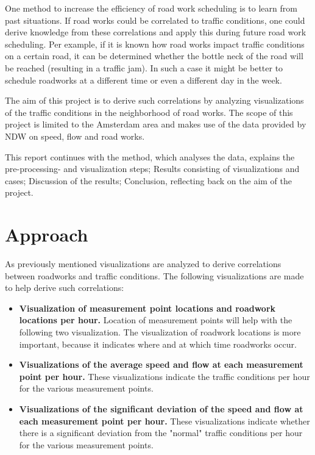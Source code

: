 \documentclass[sigconf]{acmart}
\begin{document}
One method to increase the efficiency of road work scheduling is to learn from past situations. If road works could be correlated to traffic conditions, one could derive knowledge from these correlations and apply this during future road work scheduling. Per example, if it is known how road works impact traffic conditions on a certain road, it can be determined whether the bottle neck of the road will be reached (resulting in a traffic jam). In such a case it might be better to schedule roadworks at a different time or even a different day in the week.

The aim of this project is to derive such correlations by analyzing visualizations of the traffic conditions in the neighborhood of road works. The scope of this project is limited to the Amsterdam area and makes use of the data provided by NDW on speed, flow and road works.

This report continues with the method, which analyses the data, explains the pre-processing- and visualization steps; Results consisting of visualizations and cases; Discussion of the results; Conclusion, reflecting back on the aim of the project.

\section{Approach}

As previously mentioned visualizations are analyzed to derive correlations between roadworks and traffic conditions. The following visualizations are made to help derive such correlations:
\begin{itemize}
    \item \textbf{Visualization of measurement point locations and roadwork locations per hour.} Location of measurement points will help with the following two visualization. The visualization of roadwork locations is more important, because it indicates where and at which time roadworks occur.
    \item \textbf{Visualizations of the average speed and flow at each measurement point per hour.} These visualizations indicate the traffic conditions per hour for the various measurement points.
    \item \textbf{Visualizations of the significant deviation of the speed and flow at each measurement point per hour.} These visualizations indicate whether there is a significant deviation from the "normal" traffic conditions per hour for the various measurement points.
\end{itemize}
\end{document}

